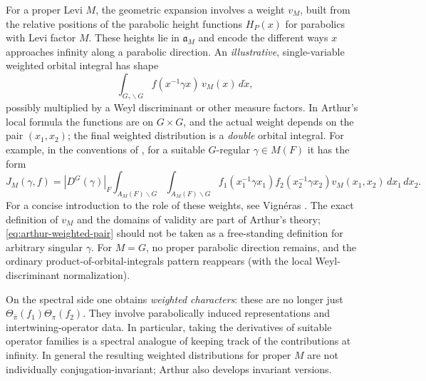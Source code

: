 \documentclass[12pt]{article}
\theoremstyle{remark}
\begin{document}
For a proper Levi $M$, the geometric expansion involves a weight
$v_M$, built from the relative positions of the parabolic height
functions $H_P(x)$ for parabolics with Levi factor $M$.
These heights lie in $\mathfrak a_M$ and encode the different
ways $x$ approaches infinity along a parabolic direction.  An
\emph{illustrative}, single-variable weighted orbital integral has
shape
\begin{equation}\label{eq:weighted-model}
 \int_{G_\gamma\backslash G}
    f(x^{-1}\gamma x)\,v_M(x)\,d\dot x,
\end{equation}
possibly multiplied by a Weyl discriminant or other measure factors.
In Arthur's local formula the functions are on $G\times G$,
and the actual weight depends on the pair $(x_1,x_2)$; the final
weighted distribution is a \emph{double} orbital integral. For
example, in the conventions of \cite[\S12]{ArthurLocal1991}, for a
suitable $G$-regular $\gamma\in M(F)$ it has the form
\begin{equation}\label{eq:arthur-weighted-pair}
 J_M(\gamma,f)=|D^G(\gamma)|_F
 \int_{A_M(F)\backslash G}\!\int_{A_M(F)\backslash G}
 f_1(x_1^{-1}\gamma x_1)f_2(x_2^{-1}\gamma x_2)
 v_M(x_1,x_2)\,dx_1\,dx_2.
\end{equation}
For a concise introduction to the role of these weights,
see Vign\'eras \cite[\S2.2]{Vigneras1991}.
The exact definition of $v_M$ and the domains of validity are
part of Arthur's theory; \eqref{eq:arthur-weighted-pair}
should not be taken as a free-standing definition for arbitrary
singular $\gamma$. For $M=G$, no proper parabolic direction
remains, and the ordinary product-of-orbital-integrals pattern
reappears (with the local Weyl-discriminant normalization).

On the spectral side one obtains \emph{weighted characters}:
these are no longer just $\Theta_{\bar\pi}(f_1)\Theta_\pi(f_2)$.
They involve parabolically induced representations and
intertwining-operator data. In particular, taking the derivatives
of suitable operator families is a spectral analogue of keeping
track of the contributions at infinity. In general the resulting
weighted distributions for proper $M$ are not individually
conjugation-invariant; Arthur also develops invariant versions.
\end{document}
